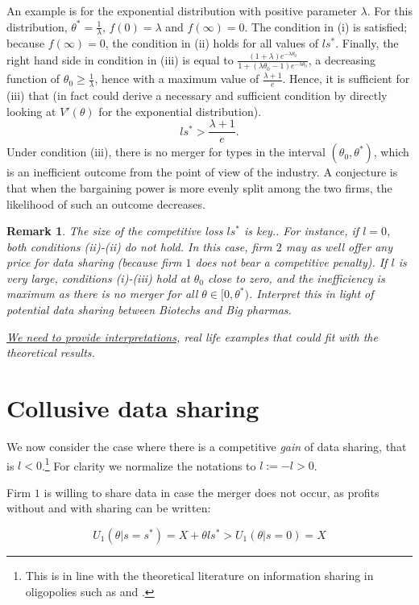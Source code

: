 \documentclass[a4paper]{article}
\newtheorem{remark}{Remark}
\renewcommand{\t}{\theta}
\begin{document}
%
An example is for the exponential distribution with positive parameter $\lambda$. For this distribution, $\t^*=\frac{1}{\lambda}$, $f(0)=\lambda$ and $f(\infty)=0$. The condition in (i) is satisfied; because $f(\infty)=0$, the condition in (ii) holds for all values of $ls^*$. Finally, the right hand side in condition in (iii) is equal to $\frac{(1+\lambda) e^{-\lambda \t_0}}{1+(\lambda \t_0-1)e^{-\lambda \t_0}}$, a decreasing function of $\t_0\geq \frac{1}{\lambda}$, hence with a maximum value of $\frac{\lambda+1}{e}$. Hence, it is sufficient for (iii) that (in fact could derive a necessary and sufficient condition by directly looking at $V'(\t)$ for the exponential distribution).
%
\[
ls^*>\frac{\lambda+1}{e}.
\]
%
%
Under condition (iii), there is no merger for types in the interval $(\t_0,\t^*)$, which is an inefficient outcome from the point of view of the industry. A conjecture is that when the bargaining power is more evenly split among the two firms, the likelihood of such an outcome decreases.

\begin{remark}
  The size of the competitive loss $ls^*$ is key.. For instance, if $l=0$, both conditions (ii)-(ii) do not hold. In this case, firm $2$ may as well offer any price for data sharing (because firm $1$ does not bear a competitive penalty). If $l$ is very large, conditions (i)-(iii) hold at $\t_0$ close to zero, and the inefficiency is maximum as there is no merger for all $\t\in[0,\t^*)$. Interpret this in light of potential data sharing between Biotechs and Big pharmas.

  \underline{We need to provide interpretations}, real life examples that could fit with the theoretical results. 
  \end{remark}

\section{Collusive data sharing}

We now consider the case where there is a competitive \emph{gain} of data sharing, that is $l<0$.\footnote{This is in line with the theoretical literature on information sharing in oligopolies such as \cite{vives1984duopoly} and \cite{gal1986information}.} For clarity we normalize the notations to $l:=-l>0$.
 

Firm $1$ is willing to share data in case the merger does not occur, as profits without and with sharing can be written:

\[
U_1(\t|s=s^*)=X+\t l s^* > U_1(\t|s=0)=X
\]
\end{document}

